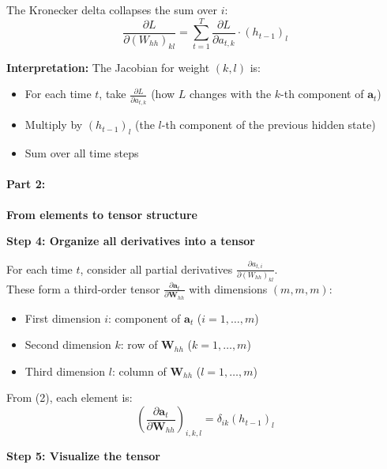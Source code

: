 \begin{notechapter}
The Kronecker delta collapses the sum over $i$:
\[
\boxed{\frac{\partial L}{\partial (W_{hh})_{kl}} =
\sum_{t=1}^{T} \frac{\partial L}{\partial a_{t,k}} \cdot (h_{t-1})_l}
\tag{W.3}
\]

\textbf{Interpretation:} The Jacobian for weight $(k,l)$ is:
\begin{itemize}
    \item For each time $t$, take $\frac{\partial L}{\partial a_{t,k}}$
    (how $L$ changes with the $k$-th component of $\mathbf{a}_t$)
    \item Multiply by $(h_{t-1})_l$ (the $l$-th component of the previous hidden state)
    \item Sum over all time steps
\end{itemize}

\paragraph{Part 2:}\textbf{From elements to tensor structure}

\vspace{1em}
\textbf{Step 4: Organize all derivatives into a tensor}
\vspace{1em}

For each time $t$, consider all partial derivatives
$\frac{\partial a_{t,i}}{\partial (W_{hh})_{kl}}$.\\

These form a third-order tensor $\frac{\partial \mathbf{a}_t}{\partial
\mathbf{W}_{hh}}$
with dimensions $(m, m, m)$:
\begin{itemize}
    \item First dimension $i$: component of $\mathbf{a}_t$ ($i = 1, \dots, m$)
    \item Second dimension $k$: row of $\mathbf{W}_{hh}$ ($k = 1, \dots, m$)
    \item Third dimension $l$: column of $\mathbf{W}_{hh}$ ($l = 1, \dots, m$)
\end{itemize}

From (2), each element is:
\[
\left(\frac{\partial \mathbf{a}_t}{\partial \mathbf{W}_{hh}}\right)_{i,k,l} = \delta_{ik} (h_{t-1})_l
\]

\vspace{1em}
\textbf{Step 5: Visualize the tensor}
\vspace{1em}


\end{notechapter}

